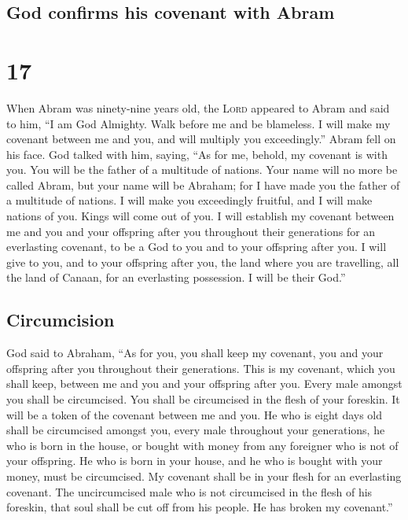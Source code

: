 \hypertarget{god-confirms-his-covenant-with-abram}{%
\subsection{God confirms his covenant with
Abram}\label{god-confirms-his-covenant-with-abram}}

\hypertarget{section-16}{%
\section{17}\label{section-16}}

 When Abram was ninety-nine years old, the \textsc{Lord}
appeared to Abram and said to him, ``I am God Almighty. Walk before me
and be blameless.  I will make my covenant between me and
you, and will multiply you exceedingly.''  Abram fell on
his face. God talked with him, saying,  ``As for me,
behold, my covenant is with you. You will be the father of a multitude
of nations.  Your name will no more be called Abram, but
your name will be Abraham; for I have made you the father of a multitude
of nations.  I will make you exceedingly fruitful, and I
will make nations of you. Kings will come out of you.  I
will establish my covenant between me and you and your offspring after
you throughout their generations for an everlasting covenant, to be a
God to you and to your offspring after you.  I will give
to you, and to your offspring after you, the land where you are
travelling, all the land of Canaan, for an everlasting possession. I
will be their God.''

\hypertarget{circumcision}{%
\subsection{Circumcision}\label{circumcision}}

 God said to Abraham, ``As for you, you shall keep my
covenant, you and your offspring after you throughout their generations.
 This is my covenant, which you shall keep, between me
and you and your offspring after you. Every male amongst you shall be
circumcised.  You shall be circumcised in the flesh of
your foreskin. It will be a token of the covenant between me and you.
 He who is eight days old shall be circumcised amongst
you, every male throughout your generations, he who is born in the
house, or bought with money from any foreigner who is not of your
offspring.  He who is born in your house, and he who is
bought with your money, must be circumcised. My covenant shall be in
your flesh for an everlasting covenant.  The
uncircumcised male who is not circumcised in the flesh of his foreskin,
that soul shall be cut off from his people. He has broken my covenant.''

